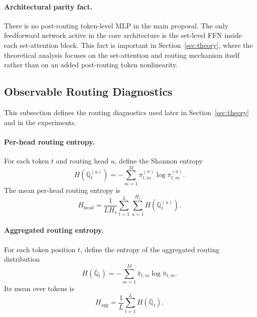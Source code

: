 \documentclass{article}
\theoremstyle{plain}
\theoremstyle{definition}
\theoremstyle{remark}
\begin{document}
\paragraph{Architectural parity fact.}
There is no post-routing token-level MLP in the main proposal. The only feedforward network active in the core architecture is the set-level FFN inside each set-attention block. This fact is important in Section~\ref{sec:theory}, where the theoretical analysis focuses on the set-attention and routing mechanism itself rather than on an added post-routing token nonlinearity.

\subsection{Observable Routing Diagnostics}
\label{sec:routing-diagnostics}

This subsection defines the routing diagnostics used later in Section~\ref{sec:theory} and in the experiments.

\paragraph{Per-head routing entropy.}
For each token $t$ and routing head $u$, define the Shannon entropy
\begin{equation}
\label{eq:per-head-entropy-single}
H(\mathbb Q_t^{(u)})
=
-\sum_{m=1}^M \pi_{t,m}^{(u)}\log \pi_{t,m}^{(u)}.
\end{equation}
The mean per-head routing entropy is
\begin{equation}
\label{eq:per-head-entropy-mean}
H_{\mathrm{head}}
=
\frac{1}{LH_r}
\sum_{t=1}^L\sum_{u=1}^{H_r}
H(\mathbb Q_t^{(u)}).
\end{equation}

\paragraph{Aggregated routing entropy.}
For each token position $t$, define the entropy of the aggregated routing distribution
\begin{equation}
\label{eq:aggregated-entropy-single}
H(\bar{\mathbb Q}_t)
=
-\sum_{m=1}^M \bar\pi_{t,m}\log \bar\pi_{t,m}.
\end{equation}
Its mean over tokens is
\begin{equation}
\label{eq:aggregated-entropy}
H_{\mathrm{agg}}
=
\frac{1}{L}\sum_{t=1}^L H(\bar{\mathbb Q}_t).
\end{equation}
\end{document}
